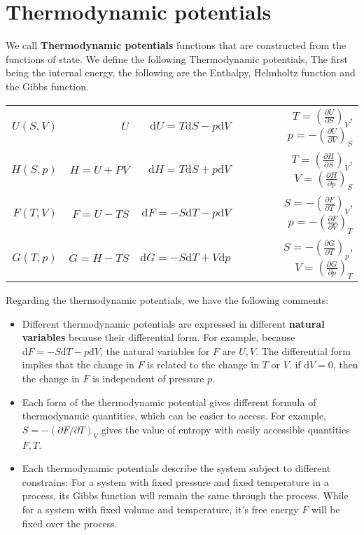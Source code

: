 \documentclass{article}
\newcommand{\pfrac}[2]{\frac{\partial #1}{\partial #2}}
\newcommand{\dnor}{\text{d}}
\begin{document}
\section{Thermodynamic potentials}
We call \textbf{Thermodynamic potentials} functions that are constructed from 
the functions of state. 
We define the following Thermodynamic potentials, The first being the internal 
energy, the following are the Enthalpy, Helmholtz function and the Gibbs 
function.

\begin{table*}[h]
    \centering
    \begin{tabular}{rrrr}
     $U(S,V)$ &   $U$          & $\dnor U =   T \dnor S - p \dnor V$ & $T = \left(\pfrac{U}{S}\right)_V$, $p = -\left(\pfrac{U}{V}\right)_S$ \\
     $H(S,p)$ &   $H = U + PV$ & $\dnor H =   T \dnor S + p \dnor V$ & $T = \left(\pfrac{H}{S}\right)_V$, $V = \left(\pfrac{H}{p}\right)_S$ \\
     $F(T,V)$ &   $F = U - TS$ & $\dnor F = - S \dnor T - p \dnor V$ & $S = -\left(\pfrac{F}{T}\right)_V$, $p = -\left(\pfrac{F}{V}\right)_T$ \\
     $G(T,p)$ &   $G = H - TS$ & $\dnor G = - S \dnor T + V \dnor p$ & $S = -\left(\pfrac{G}{T}\right)_p$, $V = \left(\pfrac{G}{p}\right)_T$ \\
     \end{tabular}
\end{table*}

Regarding the thermodynamic potentials, we have the following comments:
\begin{itemize}
    \item Different thermodynamic potentials are expressed in different \textbf{natural variables} because 
            their differential form. For example, because $\dnor F = - S \dnor T - p \dnor V$, the natural variables for $F$ are $U, V$. 
            The differential form implies that the change in $F$ is related to the change in $T$ or $V$. if $\dnor V = 0$, then the change
            in $F$ is independent of pressure $p$. 
    \item Each form of the thermodynamic potential gives different formula of thermodynamic quantities, which can be easier to access. For 
            example, $S = -\left(\partial{F}/\partial{T}\right)_V$ gives the value of entropy with easily accessible quantities $F, T$.
    \item Each thermodynamic potentials describe the system subject to different constrains: For a system with fixed pressure and fixed temperature
            in a process, its Gibbs function will remain the same through the process. While for a system with fixed volume and temperature, 
            it's free energy $F$ will be fixed over the process.
\end{itemize}
\end{document}

